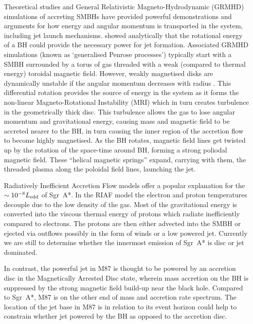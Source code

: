 Theoretical studies and General Relativistic Magneto-Hydrodynamic (GRMHD) simulations of accreting SMBHs \citep[e.g.][]{Gammie_2003} have provided powerful demonstrations and arguments for how energy and angular momentum is transported in the system, including jet launch mechanisms.\citet{Penrose_1969} showed analytically that the rotational energy of a BH could provide the necessary power for jet formation. Associated GRMHD simulations (known as `generalised Penrose processes') typically start with a SMBH surrounded by a torus of gas threaded with a weak (compared to thermal energy) toroidal magnetic field. However, weakly magnetised disks are dynamically unstable if the angular momentum decreases with radius \citep{Balbus_1998}. This differential rotation provides the source of energy in the system as it forms the non-linear Magneto-Rotational Instability (MRI) which in turn creates turbulence in the geometrically thick disc. This turbulence allows the gas to lose angular momentum and gravitational energy, causing mass and magnetic field to be accreted nearer to the BH, in turn causing the inner region of the accretion flow to become highly magnetised. As the BH rotates, magnetic field lines get twisted up by the rotation of the space-time around BH, forming a strong poliodal magnetic  field. These ``helical magnetic springs'' \citep{Narayan_2013} expand, carrying with them, the threaded plasma along the poloidal field lines, launching the jet.  


Radiatively Inefficient Accretion Flow \citep[(RIAF),][]{Narayan_1995,Yuan_2003} models offer a popular explanation for the $\sim 10^{-8} L_{\rm edd}$ of Sgr~A*. In the RIAF model the electron and proton temperatures decouple due to the low density of the gas. Most of the gravitational energy is converted into the viscous thermal energy of protons which radiate inefficiently compared to electrons. The protons are then either advected into the SMBH or ejected via outflows possibly in the form of winds or a low powered jet. Currently we are still to determine whether the innermost emission of Sgr~A* is disc or jet dominated.


In contrast, the powerful jet in M87 is thought to be powered by an accretion disc in the Magnetically Arrested Disc \citep[(MAD),][]{Narayan_2003} state, wherein mass accretion on the BH is suppressed by the strong magnetic field build-up near the black hole. Compared to Sgr~A*, M87 is on the other end of mass and accretion rate spectrum. The location of the jet base in M87 is in relation to its event horizon could help to constrain whether jet powered by the BH as opposed to the accretion disc.


